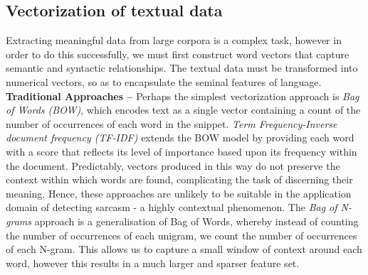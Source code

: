 \documentclass[12pt,a4paper]{article}
\begin{document}

\subsection{Vectorization of textual data}
\noindent Extracting meaningful data from large corpora is a complex task, however in order to do this successfully, we must first construct word vectors that capture semantic and syntactic relationships. The textual data must be transformed into numerical vectors, so as to encapsulate the seminal features of language.\\

\noindent \textbf{Traditional Approaches --} Perhaps the simplest vectorization approach is \textit{Bag of Words (BOW)}, which encodes text as a single vector containing a count of the number of occurrences of each word in the snippet. \textit{Term Frequency-Inverse document frequency (TF-IDF)} \cite{robertson1976relevance} extends the BOW model by providing each word with a score that reflects its level of importance based upon its frequency within the document. Predictably, vectors produced in this way do not preserve the context within which words are found, complicating the task of discerning their meaning. Hence, these approaches are unlikely to be suitable in the application domain of detecting sarcasm - a highly contextual phenomenon. The \textit{Bag of N-grams} approach is a generalisation of Bag of Words, whereby instead of counting the number of occurrences of each unigram, we count the number of occurrences of each N-gram. This allows us to capture a small window of context around each word, however this results in a much larger and sparser feature set.\\
\end{document}
